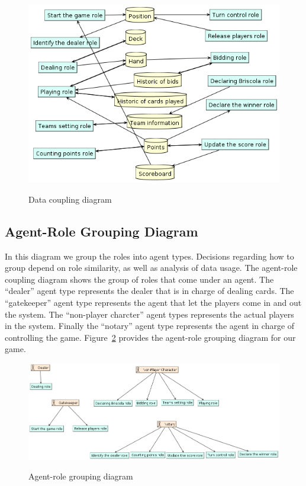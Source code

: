 \documentclass[a4paper]{article}
\begin{document}
\begin{figure}[htp]
  \includegraphics[keepaspectratio,scale=0.45]{pdt/images/architectural_design/data_coupling.png}
  \label{fig:datacoupl}
  \caption{Data coupling diagram}
\end{figure}

\subsection{Agent-Role Grouping Diagram}

In this diagram we group the roles into agent types. Decisions regarding how to group depend on role similarity, as well as analysis of data usage. The agent-role coupling diagram shows the group of roles that come under an agent. The ``dealer'' agent type represents the dealer that is in charge of dealing cards. The ``gatekeeper'' agent type represents the agent that let the players come in and out the system. The ``non-player charcter'' agent types represents the actual players in the system. Finally the ``notary'' agent type represents the agent in charge of controlling the game. Figure~\ref{fig:agentrole} provides the agent-role grouping diagram for our game.

\begin{figure}[htp]
  \includegraphics[keepaspectratio,scale=0.45]{pdt/images/architectural_design/aget-role_grouping.png}
  \label{fig:agentrole}
  \caption{Agent-role grouping diagram}
\end{figure}
\end{document}
